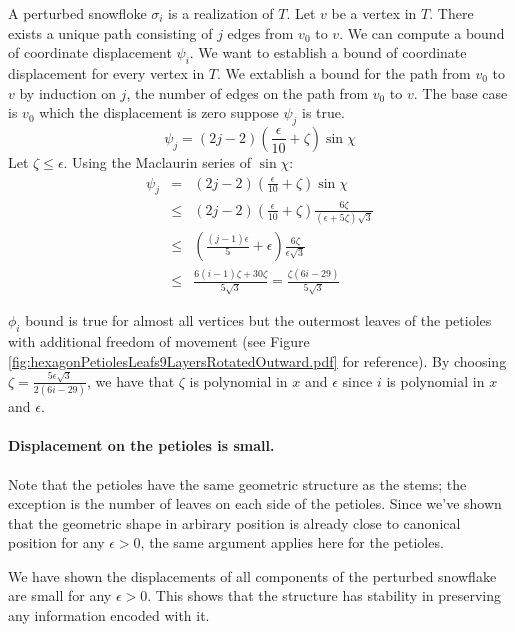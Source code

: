 \documentclass[10pt]{CSUNthesis}
\theoremstyle{plain}%
\theoremstyle{definition}
\theoremstyle{remark}
\newcommand{\lr}[1]{\left( #1 \right)}
\begin{document}
A perturbed snowfloke $\sigma_i$ is a realization of $T$.  
Let $v$ be a vertex in $T$.  
There exists a unique path consisting of $j$ edges from $v_0$ to $v$.  
We can compute a bound of coordinate displacement $\psi_i$.  
We want to establish a bound of coordinate displacement for every vertex in $T$.  
We extablish a bound for the path from $v_0$ to $v$ by induction on $j$, the number of edges on the path from $v_0$ to $v$.  
The base case is $v_0$ which the displacement is zero suppose $\psi_j$ is true.  
$$\psi_j = (2j-2) \lr{\frac{\epsilon}{10} + \zeta} \sin \chi$$
Let $\zeta \leq \epsilon$.  
Using the Maclaurin series of $\sin \chi$:
$$
\begin{array}{rcl}
\psi_j &=& (2j-2) \lr{\frac{\epsilon}{10} + \zeta} \sin \chi\\
&\leq& (2j-2) \lr{\frac{\epsilon}{10} + \zeta}  \frac{6 \zeta}{\lr{\epsilon + 5 \zeta}\sqrt{3}}\\
&\leq& \lr{\frac{(j-1)\epsilon}{5} + \epsilon} \frac{6 \zeta}{\epsilon\sqrt{3}}\\
&\leq& \frac{6(i-1)\zeta + 30\zeta}{5\sqrt{3}}= \frac{\zeta(6i-29)}{5 \sqrt{3}}
\end{array}
$$

$\phi_i$ bound is true for almost all vertices but the outermost leaves of the petioles with additional freedom of movement (see Figure \ref{fig:hexagonPetiolesLeafs9LayersRotatedOutward.pdf} for reference).  
By choosing $\zeta = \frac{5\epsilon  \sqrt{3}}{2(6i-29)}$, we have that $\zeta$ is polynomial in $x$ and $\epsilon$ since $i$ is polynomial in $x$ and $\epsilon$.
\paragraph{Displacement on the petioles is small.}
Note that the petioles have the same geometric structure as the stems; the exception is the number of leaves on each side of the petioles. 
Since we've shown that the geometric shape in arbirary position is already close to canonical position for any $\epsilon>0$, the same argument applies here for the petioles.

We have shown the displacements of all components of the perturbed snowflake are small for any $\epsilon > 0$.  
This shows that the structure has stability in preserving any information encoded with it.%
\end{document}
